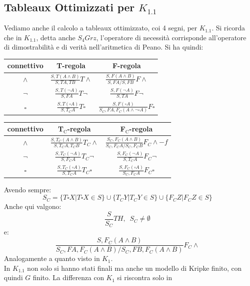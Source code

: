 \documentclass[a4paper,12pt, oneside]{book}
\begin{document}
\subsection{Tableaux Ottimizzati per $K_{1.1}$}
Vediamo anche il calcolo a tableaux ottimizzato, coi 4 segni, per $K_{1.1}$. Si
ricorda che in $K_{1.1}$, detta anche $S_4Grz$, l'operatore di necessità
corrisponde all'operatore di dimostrabilità e di verità nell'aritmetica di
Peano. Si ha quindi:
\begin{table}[H]
  \Large
  \centering
  \begin{tabular}{c||c|c}
    connettivo& T-regola& F-regola\\
    \hline
    \hline
    $\land$ & $\frac{S,T(A\land B)}{S,TA,TB}T\land$&
                        $\frac{S,F(A\land B)}{S,FA/S,FB}F\land$\\
    \hline
    $\neg$ & $\frac{S,T(\neg A)}{S,FA}T\neg$&
                        $\frac{S,F(\neg A)}{S,TA}F\neg$\\
    \hline
    $\square$ & $\frac{S,T(\square A)}{S,T_CA}T\square$&
             $\frac{S,F(\square A)}{S_C,FA,F_C(A\land\neg\square A)}F\square$\\
  \end{tabular}
\end{table}
\begin{table}[H]
  \Large
  \centering
  \begin{tabular}{c||c|c}
    connettivo& T$_{\mbox{C}}$-regola&F$_{\mbox{C}}$-regola\\
    \hline
    \hline
    $\land$ & $\frac{S,T_C(A\land B)}{S,T_CA,T_CB}T_C\land$&
              $\frac{S_C,F_C(A\land B)}{S_C,F_CA/S_C,F_CB}F_C\land -f$\\
    \hline
    $\neg$ & $\frac{S,T_C(\neg A)}{S,F_CA}T_C\neg$&
            $\frac{S,F_C(\neg A)}{S,T_CA}F_C\neg$\\
    \hline
    $\square$ & $\frac{S,T_C(\square A)}{S,T_CA}T_C\square$ &
               $\frac{S,F_C(\square A)}{S_C,F_CA}F_C\square$
  \end{tabular}
\end{table}
Avendo sempre:
\[S_C=\{T\square X|T\square X\in S\}\cup\{T_CY|T_CY\in S\}
  \cup\{F_CZ|F_CZ\in S\}\]
Anche qui valgono:
\[\frac{S}{S_C}TH,\,\,\,S_C\neq \emptyset\]
e:
\[\frac{S,F_C(A\land B)}{S_C,FA,F_C(A\land B)/S_C,FB,F_C(A\land B)}F_C\land\]
Analogamente a quanto visto in $K_1$.\\
In $K_{1.1}$ non solo si hanno stati finali ma anche un modello di Kripke
finito, con quindi $G$ finito. La differenza con $K_1$ si riscontra solo in
\end{document}
